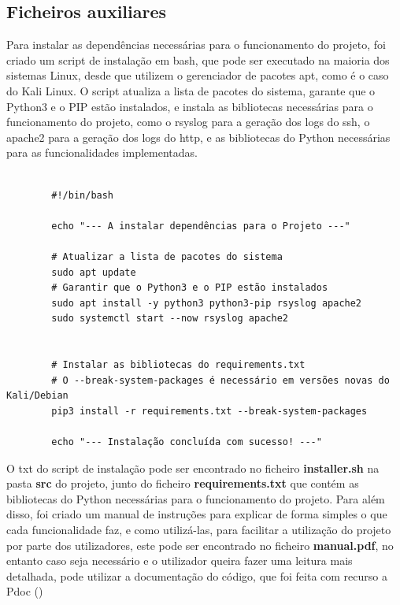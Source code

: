 \documentclass[a4paper]{article}
\begin{document}
\subsection{Ficheiros auxiliares}
Para instalar as dependências necessárias para o funcionamento do projeto, foi criado um script de instalação em bash, que pode ser executado na maioria dos sistemas Linux, desde 
que utilizem o gerenciador de pacotes apt, como é o caso do Kali Linux. O script atualiza a lista de pacotes do sistema, garante que o Python3 e o PIP estão instalados, e instala 
as bibliotecas necessárias para o funcionamento do projeto, como o rsyslog para a geração dos logs do ssh, o apache2 para a geração dos logs do http, e as bibliotecas do Python 
necessárias para as funcionalidades implementadas.\\\\
\begin{minipage}{\textwidth}
    \begin{verbatim}
        #!/bin/bash

        echo "--- A instalar dependências para o Projeto ---"

        # Atualizar a lista de pacotes do sistema
        sudo apt update
        # Garantir que o Python3 e o PIP estão instalados
        sudo apt install -y python3 python3-pip rsyslog apache2
        sudo systemctl start --now rsyslog apache2


        # Instalar as bibliotecas do requirements.txt
        # O --break-system-packages é necessário em versões novas do Kali/Debian
        pip3 install -r requirements.txt --break-system-packages

        echo "--- Instalação concluída com sucesso! ---"
    \end{verbatim}
   
\end{minipage}
O txt do script de instalação pode ser encontrado no ficheiro \textbf{installer.sh} na pasta \textbf{src} do projeto, junto do ficheiro \textbf{requirements.txt} que contém 
as bibliotecas do Python necessárias para o funcionamento do projeto.
\newpage
Para além disso, foi criado um manual de instruções para explicar de forma simples o que cada funcionalidade faz, 
e como utilizá-las, para facilitar a utilização do projeto por parte dos utilizadores, este pode ser encontrado no 
ficheiro \textbf{manual.pdf}, no entanto caso seja necessário e o utilizador queira fazer uma leitura mais detalhada, 
pode utilizar a documentação do código, que foi feita com recurso a Pdoc (\cite{pdoc})
\end{document}
